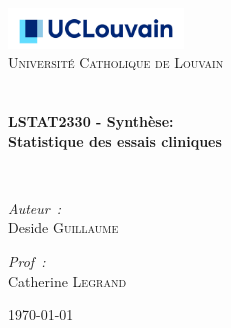 \begin{titlepage}
\begin{center}

\includegraphics[width=0.35\textwidth]{images/UL.jpg}~\\[1cm]

\textsc{\LARGE Université Catholique de Louvain}\\[1.5cm]

\textsc{\Large }\\[0.5cm]

\HRule \\[0.4cm]

{\huge \bfseries LSTAT2330 - Synthèse:\\
Statistique des essais cliniques \\[0.4cm] }

\HRule \\[1.5cm]

\begin{minipage}{0.4\textwidth}
\begin{flushleft} \large
\emph{Auteur :}\\
Deside \textsc{Guillaume}\\

\end{flushleft}
\end{minipage}
\begin{minipage}{0.4\textwidth}
\begin{flushright} \large
\emph{Prof :} \\
Catherine \textsc{Legrand}\\
\end{flushright}
\end{minipage}

\vfill

{\large \today}

\end{center}
\end{titlepage}